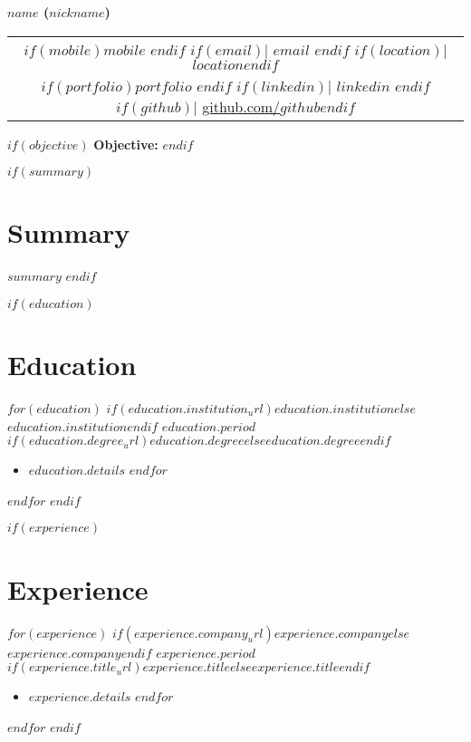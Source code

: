 \documentclass[10.5pt,a4paper]{article}
\newcommand{\daterange}[1]{\textbf{#1}}
\begin{document}
\begin{center}
	{\LARGE \textbf{$name$ ($nickname$)}}\\
	\begin{tabular}{@{}c@{}}
		$if(mobile)$$mobile$ $endif$
		$if(email)$| \href{mailto:$email$}{$email$} $endif$
		$if(location)$| $location$$endif$ \\
			$if(portfolio)$\href{https://$portfolio$?utm_source=resume&utm_medium=document}{$portfolio$} $endif$
		$if(linkedin)$| \href{https://$linkedin$}{$linkedin$} $endif$
		$if(github)$| \href{https://github.com/$github$}{github.com/$github$}$endif$
	\end{tabular}
\end{center}

$if(objective)$
{\large\bfseries\color{sectioncolor}Objective:} 
$endif$

$if(summary)$
\section*{Summary}
$summary$
$endif$

$if(education)$
\section*{Education}
$for(education)$
\noindent\textbf{$if(education.institution_url)$\href{$education.institution_url$}{$education.institution$}$else$$education.institution$$endif$} \hfill \daterange{$education.period$}\\
$if(education.degree_url)$\href{$education.degree_url$}{$education.degree$}$else$$education.degree$$endif$
\begin{itemize}
	$for(education.details)$
	\item $education.details$
	      $endfor$
\end{itemize}
\vspace{-0.1cm}
$endfor$
$endif$

$if(experience)$
\section*{Experience}
$for(experience)$
\noindent\textbf{$if(experience.company_url)$\href{$experience.company_url$}{$experience.company$}$else$$experience.company$$endif$} \hfill \daterange{$experience.period$}\\
\textit{$if(experience.title_url)$\href{$experience.title_url$}{$experience.title$}$else$$experience.title$$endif$}
\begin{itemize}
	$for(experience.details)$
	\item $experience.details$
	      $endfor$
\end{itemize}
\vspace{-0.1cm}
$endfor$
$endif$
\end{document}
